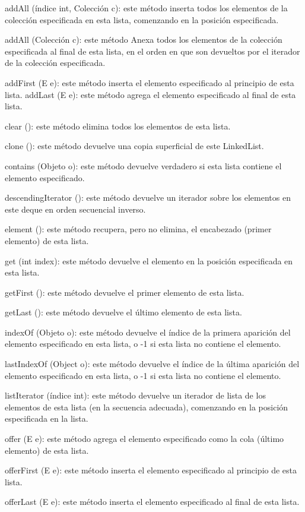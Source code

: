 \documentclass[12pt,a4paper]{report}
\begin{document}
{addAll (índice int, Colección c): este método inserta todos los elementos de la colección especificada en esta lista, comenzando en la posición especificada.

addAll (Colección c): este método Anexa todos los elementos de la colección especificada al final de esta lista, en el orden en que son devueltos por el iterador de la colección especificada.

addFirst (E e): este método inserta el elemento especificado al principio de esta lista.
addLast (E e): este método agrega el elemento especificado al final de esta lista.

clear (): este método elimina todos los elementos de esta lista.

clone (): este método devuelve una copia superficial de este LinkedList.

contains (Objeto o): este método devuelve verdadero si esta lista contiene el elemento especificado.

descendingIterator (): este método devuelve un iterador sobre los elementos en este deque en orden secuencial inverso.

element (): este método recupera, pero no elimina, el encabezado (primer elemento) de esta lista.

get (int index): este método devuelve el elemento en la posición especificada en esta lista.

getFirst (): este método devuelve el primer elemento de esta lista.

getLast (): este método devuelve el último elemento de esta lista.

indexOf (Objeto o): este método devuelve el índice de la primera aparición del elemento especificado en esta lista, o -1 si esta lista no contiene el elemento.

lastIndexOf (Object o): este método devuelve el índice de la última aparición del elemento especificado en esta lista, o -1 si esta lista no contiene el elemento.

listIterator (índice int): este método devuelve un iterador de lista de los elementos de esta lista (en la secuencia adecuada), comenzando en la posición especificada en la lista.

offer (E e): este método agrega el elemento especificado como la cola (último elemento) de esta lista.

offerFirst (E e): este método inserta el elemento especificado al principio de esta lista.

offerLast (E e): este método inserta el elemento especificado al final de esta lista.

}
\end{document}

